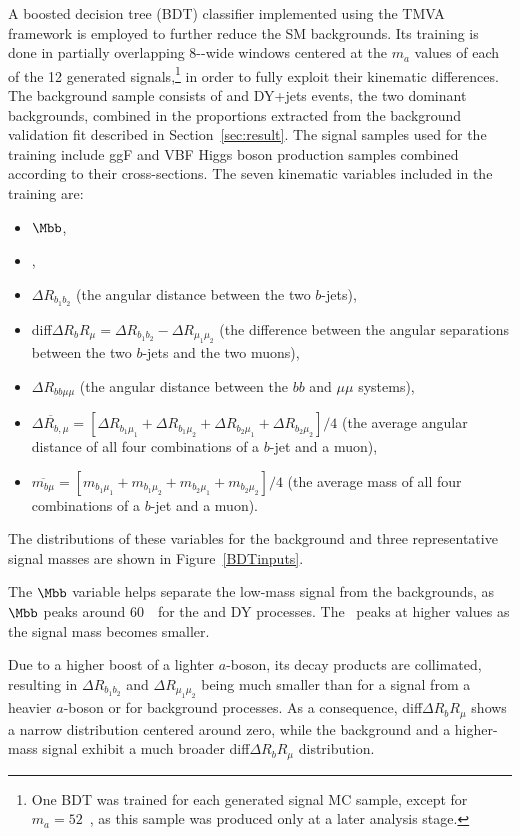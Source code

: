 \documentclass[cernpreprint, backref=false, texlive=2020, UKenglish, dvipsnames, block=none, texmf]{atlasdoc}
\begin{document}
A boosted decision tree (BDT) classifier implemented using the TMVA framework \cite{Speckmayer:2010zz} is employed to further reduce the SM backgrounds.
Its training is done in partially overlapping 8-\GeV-wide \Mmm windows centered at the $m_a$ values of each of the 12 generated signals,\footnote{One BDT was trained for each generated signal MC sample, except for $m_a = 52$~\GeV, as this sample was produced only at a later analysis stage.} in order to fully exploit their kinematic differences.
The background sample consists of \ttbar and DY+jets events, the two dominant backgrounds, combined in the proportions extracted from the background validation fit described in Section~\ref{sec:result}. The signal samples used for the training include ggF and VBF Higgs boson production samples combined according to their cross-sections.
The seven kinematic variables included in the training are:
\begin{itemize}
\item{$\Mbb$,}
\item{\LogL,}
\item{$\Delta R_{b_1b_2}$ (the angular distance between the two $b$-jets),}
\item{diff$\Delta R_bR_{\mu}=\Delta R_{b_1b_2}-\Delta R_{\mu_1\mu_2}$ (the difference between the angular separations between the two $b$-jets and the two muons),}
\item{$\Delta R_{bb\mu\mu}$ (the angular distance between the $bb$ and $\mu\mu$ systems),}
\item{$\overline{\Delta R_{b,\mu}} = \left[\Delta R_{b_1\mu_1}+\Delta R_{b_1\mu_2}+\Delta R_{b_2\mu_1}+\Delta R_{b_2\mu_2}\right]/4$ (the average angular distance  of all four combinations of a $b$-jet and a muon),}
\item{$\overline{m_{b\mu}}=\left[m_{b_1\mu_1}+m_{b_1\mu_2}+m_{b_2\mu_1}+m_{b_2\mu_2}\right]/4$ (the average mass of all four combinations of a $b$-jet and a muon).}
\end{itemize}
The distributions of these variables for the background and three representative signal masses are shown in Figure~\ref{BDTinputs}.
 
The $\Mbb$ variable helps separate the low-mass signal from the backgrounds, as $\Mbb$ peaks around 60~\GeV\ for the \ttbar and DY processes. The \LogL~peaks at higher values as the signal mass becomes smaller.
 
Due to a higher boost of a lighter $a$-boson, its decay products are collimated, resulting in $\Delta R_{b_1b_2}$ and  $\Delta R_{\mu_1\mu_2}$ being much smaller than for a signal from a heavier $a$-boson or for background processes.
As a consequence, diff$\Delta R_bR_{\mu}$ shows a narrow distribution centered around zero, while the background and a higher-mass signal exhibit a much broader diff$\Delta R_bR_{\mu}$ distribution.
 
\end{document}
